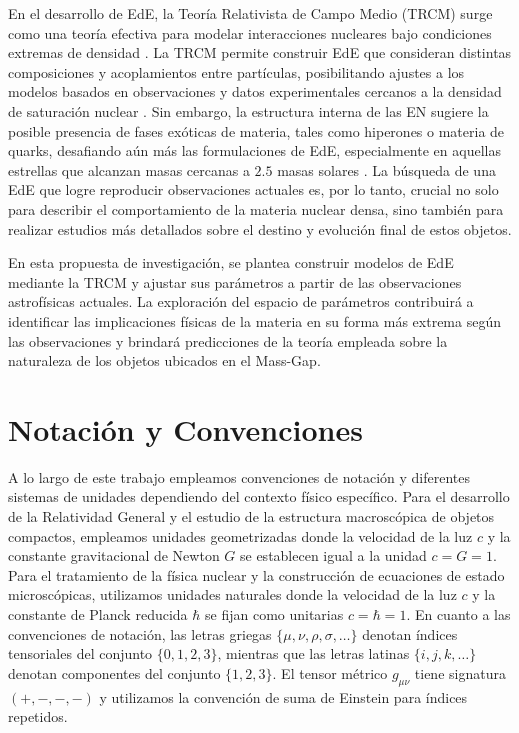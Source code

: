 En el desarrollo de EdE, la Teoría Relativista de Campo Medio (TRCM) surge como una teoría efectiva para modelar interacciones nucleares bajo condiciones extremas de densidad \cite{waleckaTheoryHighlyCondensed1974,waleckaRelativisticNuclearManyBody1986}. La TRCM permite construir EdE que consideran distintas composiciones y acoplamientos entre partículas, posibilitando ajustes a los modelos basados en observaciones y datos experimentales cercanos a la densidad de saturación nuclear \cite{dutraRelativisticMeanFieldHadronic2014}. Sin embargo, la estructura interna de las EN sugiere la posible presencia de fases exóticas de materia, tales como hiperones o materia de quarks, desafiando aún más las formulaciones de EdE, especialmente en aquellas estrellas que alcanzan masas cercanas a $2.5$ masas solares \cite{lopesNatureMassgapObject2022}. La búsqueda de una EdE que logre reproducir observaciones actuales es, por lo tanto, crucial no solo para describir el comportamiento de la materia nuclear densa, sino también para realizar estudios más detallados sobre el destino y evolución final de estos objetos.

En esta propuesta de investigación, se plantea construir modelos de EdE mediante la TRCM y ajustar sus parámetros a partir de las observaciones astrofísicas actuales. La exploración del espacio de parámetros contribuirá a identificar las implicaciones físicas de la materia en su forma más extrema según las observaciones y brindará predicciones de la teoría empleada sobre la naturaleza de los objetos ubicados en el Mass-Gap.

\section{Notación y Convenciones}

A lo largo de este trabajo empleamos convenciones de notación y diferentes sistemas de unidades dependiendo del contexto físico específico. Para el desarrollo de la Relatividad General y el estudio de la estructura macroscópica de objetos compactos, empleamos unidades geometrizadas donde la velocidad de la luz $c$ y la constante gravitacional de Newton $G$ se establecen igual a la unidad $c = G = 1$. Para el tratamiento de la física nuclear y la construcción de ecuaciones de estado microscópicas, utilizamos unidades naturales donde la velocidad de la luz $c$ y la constante de Planck reducida $\hbar$ se fijan como unitarias $c = \hbar = 1$. En cuanto a las convenciones de notación, las letras griegas $\{\mu, \nu, \rho, \sigma, \ldots\}$ denotan índices tensoriales del conjunto $\{0,1,2,3\}$, mientras que las letras latinas $\{i, j, k, \ldots\}$ denotan componentes del conjunto $\{1,2,3\}$. El tensor métrico $g_{\mu\nu}$ tiene signatura $(+,-,-,-)$ y utilizamos la convención de suma de Einstein para índices repetidos.

